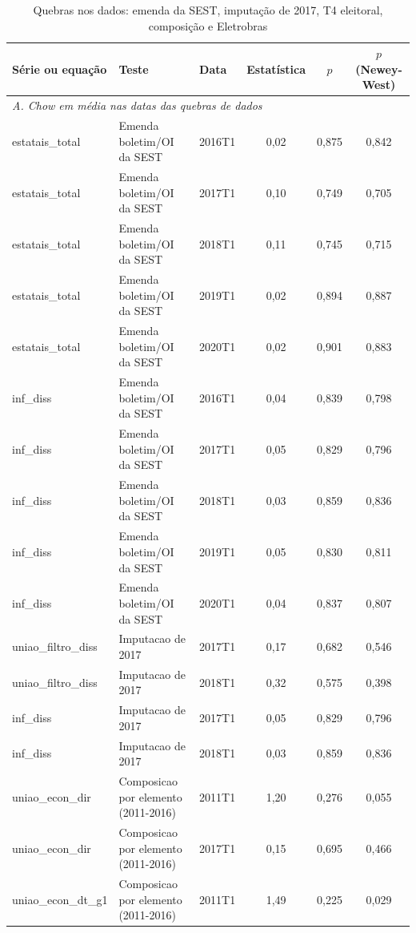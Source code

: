 \begin{table}[htbp]
\centering
\caption{Quebras nos dados: emenda da SEST, imputa\c{c}\~ao de 2017, T4 eleitoral, composi\c{c}\~ao e Eletrobras}
\label{tab:a4_dados}
\tiny
\begin{tabular}{lllccc}
\toprule
S\'erie ou equa\c{c}\~ao & Teste & Data & Estat\'istica & $p$ & $p$ (Newey-West) \\
\midrule
\multicolumn{6}{l}{\textit{A. Chow em m\'edia nas datas das quebras de dados}} \\
estatais\_total & Emenda boletim/OI da SEST & 2016T1 & 0{,}02 & 0{,}875 & 0{,}842 \\
estatais\_total & Emenda boletim/OI da SEST & 2017T1 & 0{,}10 & 0{,}749 & 0{,}705 \\
estatais\_total & Emenda boletim/OI da SEST & 2018T1 & 0{,}11 & 0{,}745 & 0{,}715 \\
estatais\_total & Emenda boletim/OI da SEST & 2019T1 & 0{,}02 & 0{,}894 & 0{,}887 \\
estatais\_total & Emenda boletim/OI da SEST & 2020T1 & 0{,}02 & 0{,}901 & 0{,}883 \\
inf\_diss & Emenda boletim/OI da SEST & 2016T1 & 0{,}04 & 0{,}839 & 0{,}798 \\
inf\_diss & Emenda boletim/OI da SEST & 2017T1 & 0{,}05 & 0{,}829 & 0{,}796 \\
inf\_diss & Emenda boletim/OI da SEST & 2018T1 & 0{,}03 & 0{,}859 & 0{,}836 \\
inf\_diss & Emenda boletim/OI da SEST & 2019T1 & 0{,}05 & 0{,}830 & 0{,}811 \\
inf\_diss & Emenda boletim/OI da SEST & 2020T1 & 0{,}04 & 0{,}837 & 0{,}807 \\
uniao\_filtro\_diss & Imputacao de 2017 & 2017T1 & 0{,}17 & 0{,}682 & 0{,}546 \\
uniao\_filtro\_diss & Imputacao de 2017 & 2018T1 & 0{,}32 & 0{,}575 & 0{,}398 \\
inf\_diss & Imputacao de 2017 & 2017T1 & 0{,}05 & 0{,}829 & 0{,}796 \\
inf\_diss & Imputacao de 2017 & 2018T1 & 0{,}03 & 0{,}859 & 0{,}836 \\
uniao\_econ\_dir & Composicao por elemento (2011-2016) & 2011T1 & 1{,}20 & 0{,}276 & 0{,}055 \\
uniao\_econ\_dir & Composicao por elemento (2011-2016) & 2017T1 & 0{,}15 & 0{,}695 & 0{,}466 \\
uniao\_econ\_dt\_g1 & Composicao por elemento (2011-2016) & 2011T1 & 1{,}49 & 0{,}225 & 0{,}029 \\

\end{tabular}
\end{table}
